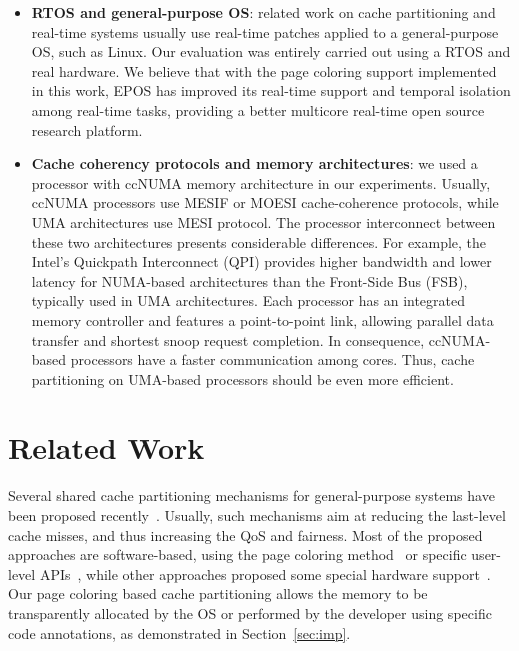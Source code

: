 \documentclass[10pt, conference, compsocconf]{IEEEtran}
\begin{document}
\begin{itemize}
	
	\item \textbf{RTOS and general-purpose OS}: related work on cache partitioning and real-time systems usually use real-time patches applied to a general-purpose OS, such as Linux. Our evaluation was entirely carried out using a RTOS and real hardware. We believe that with the page coloring support implemented in this work, EPOS has improved its real-time support and temporal isolation among real-time tasks, providing a better multicore real-time open source research platform.
	
	\item \textbf{Cache coherency protocols and memory architectures}: we used a processor with ccNUMA memory architecture in our experiments. Usually, ccNUMA processors use MESIF or MOESI cache-coherence protocols, while UMA architectures use MESI protocol. The processor interconnect between these two architectures presents considerable differences. For example, the Intel's Quickpath Interconnect (QPI) provides higher bandwidth and lower latency for NUMA-based architectures than the Front-Side Bus (FSB), typically used in UMA architectures. Each processor has an integrated memory controller and features a point-to-point link, allowing parallel data transfer and shortest snoop request completion. In consequence, ccNUMA-based processors have a faster communication among cores. Thus, cache partitioning on UMA-based processors should be even more efficient. 
\end{itemize}

\section{Related Work}
\label{sec:related}

Several shared cache partitioning mechanisms for general-purpose systems have been proposed recently~\cite{Lin:2008,Chen:2009,Muralidhara:2010}. Usually, such mechanisms aim at reducing the last-level cache misses, and thus increasing the QoS and fairness. Most of the proposed approaches are software-based, using the page coloring method~\cite{Lin:2008,Chen:2009} or specific user-level APIs~\cite{Ding:2011}, while other approaches proposed some special hardware support~\cite{Qureshi:2006,Suhendra:2008}. Our page coloring based cache partitioning allows the memory to be transparently allocated by the OS or performed by the developer using specific code annotations, as demonstrated in Section~\ref{sec:imp}.
\end{document}
